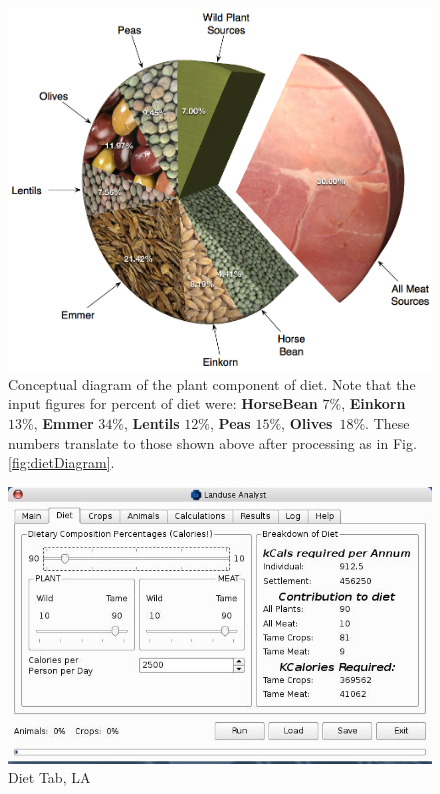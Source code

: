 \begin{figure}[htbp] %
  \includegraphics[scale=.2]{./images/dietFancyCrops.jpg}
  \caption[Plant Portion of Diet]{\label{fig:dietCropDiagram}Conceptual
    diagram of the plant component of diet.  Note that the input figures for
    percent of diet were: \textbf{HorseBean} $7\%$, \textbf{Einkorn} $13\%$,
    \textbf{Emmer} $34\%$, \textbf{Lentils} $12\%$, \textbf{Peas} $15\%$,
    \textbf{Olives}\ $18\%$.  These numbers translate to those shown above after
    processing as in Fig. \ref{fig:dietDiagram}.}
\end{figure}

\begin{figure}[htbp] %
  \includegraphics[scale=.355]{./images/LanduseAnalystDiet545.jpg}
  \caption{\label{fig:LADiet}Diet Tab, LA}
\end{figure}

